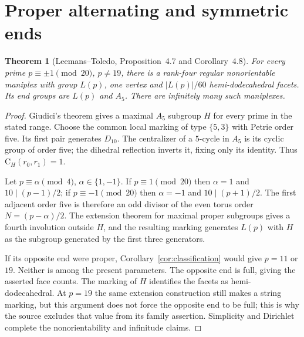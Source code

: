 \documentclass[11pt]{article}
\newtheorem{theorem}{Theorem}
\newcommand{\CG}{\mathrm C}
\begin{document}
\section{Proper alternating and symmetric ends}
\begin{theorem}[Leemans--Toledo, Proposition~4.7 and Corollary~4.8]
\label{thm:A5}
For every prime $p\equiv\pm1\pmod{20}$, $p\ne19$, there is a rank-four
regular nonorientable maniplex with group $L(p)$, one vertex and
$|L(p)|/60$ hemi-dodecahedral facets. Its end groups are $L(p)$ and
$A_5$. There are infinitely many such maniplexes.
\end{theorem}
\begin{proof}
Giudici's theorem gives a maximal $A_5$ subgroup $H$ for every
prime in the stated range. Choose the common local marking of type $\{5,3\}$
with Petrie order five. Its first pair generates $D_{10}$.
The centralizer of a $5$-cycle in $A_5$ is its cyclic group of order five;
the dihedral reflection inverts it, fixing only its identity. Thus
$\CG_H(r_0,r_1)=1$.

Let $p\equiv\alpha\pmod4$, $\alpha\in\{1,-1\}$. If
$p\equiv1\pmod{20}$ then $\alpha=1$ and $10\mid(p-1)/2$; if
$p\equiv-1\pmod{20}$ then $\alpha=-1$ and $10\mid(p+1)/2$.
The first adjacent order five is therefore an odd divisor of the even
torus order $N=(p-\alpha)/2$. The extension theorem for maximal proper subgroups gives
a fourth involution outside $H$, and the resulting marking generates
$L(p)$ with $H$ as the subgroup generated by the first three generators.

If its opposite end were proper, Corollary~\ref{cor:classification}
would give $p=11$ or $19$. Neither is among the present parameters.
The opposite end is full, giving the asserted face counts. The marking
of $H$ identifies the facets as hemi-dodecahedral. At $p=19$ the same
extension construction still makes a string marking, but this argument
does not force the opposite end to be full; this is why the source
excludes that value from its family assertion. Simplicity and Dirichlet
complete the nonorientability and infinitude claims.
\end{proof}
\end{document}
